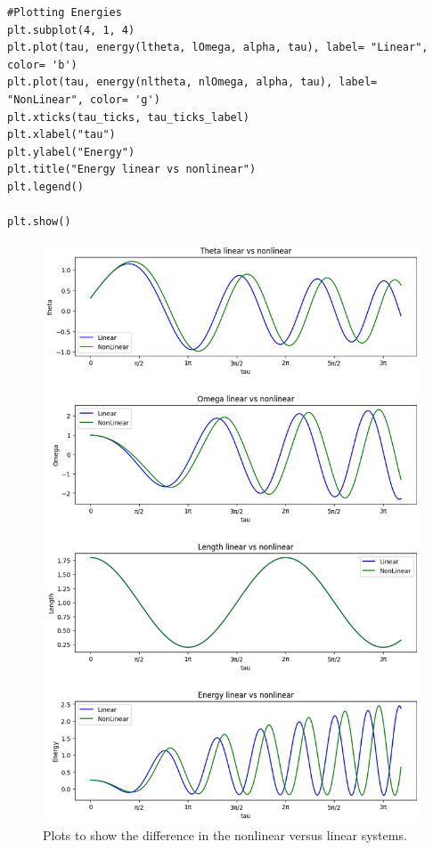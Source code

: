 \documentclass[12pt]{article}
\newcommand{\jump}{\vspace{5mm}}
\begin{document}
\begin{enumerate}[]
\begin{enumerate}[(b)]
\begin{lstlisting}
#Plotting Energies
plt.subplot(4, 1, 4)
plt.plot(tau, energy(ltheta, lOmega, alpha, tau), label= "Linear", color= 'b')
plt.plot(tau, energy(nltheta, nlOmega, alpha, tau), label= "NonLinear", color= 'g')
plt.xticks(tau_ticks, tau_ticks_label)
plt.xlabel("tau")
plt.ylabel("Energy")
plt.title("Energy linear vs nonlinear")
plt.legend()

plt.show()
\end{lstlisting}


\jump
\begin{figure}[!ht]
\centering
\includegraphics[scale = 0.6]{Images/nonlinear_vs_linear_systems.png}
\caption{Plots to show the difference in the nonlinear versus linear systems. }
\label{png:nonlinear_vs_linear_systems}
\end{figure}


\end{enumerate}
\end{enumerate}
\end{document}
